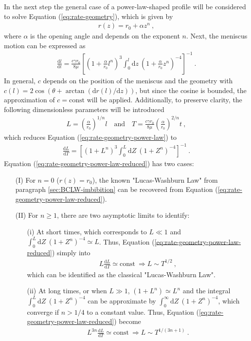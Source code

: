 \documentclass[aip, amsmath, amssymb, reprint, twocolumn, floatfix]{revtex4-1}
\newcommand{\dldt}{\frac{\mathrm{d}l}{\mathrm{d}t}}
\newcommand{\dLdT}{\frac{\mathrm{d}L}{\mathrm{d}T}}
\newcommand{\dz}{\mathrm{d}z}
\newcommand{\dZ}{\mathrm{d}Z}
\begin{document}
In the next step the general case of a power-law-shaped profile will be considered to solve Equation (\ref{eq:rate-geometry}), which is given by
\begin{gather}
	r(z) = r_0 + \alpha z^n~,
	\label{eq:power-law}
\end{gather}
where $\alpha$ is the opening angle and depends on the exponent $n$. Next, the meniscus motion can be expressed as 
\begin{gather}
	\dldt = \frac{c \gamma r_0}{8\mu} \left[ \left(1 + \frac{\alpha}{r_0} l^n \right)^3 \int_0^{l}\!\!\!\dz~\left(1 + \frac{\alpha}{r_0} z^n \right)^{-4} \right]^{-1}~.
	\label{eq:rate-geometry-power-law}
\end{gather}
In general, $c$ depends on the position of the meniscus and the geometry with $c(l) = 2\cos(\theta + \arctan(\mathrm{d}r(l)/\mathrm{d}z))$, but since the cosine is bounded, the approximation of $c = \text{const}$ will be applied. Additionally, to preserve clarity, the following dimensionless parameters will be introduced
\begin{gather}
	L = \left(\frac{\alpha}{r_0}\right)^{1/n} l\quad\text{and}\quad T = \frac{c\gamma r_0}{8\mu} \left(\frac{\alpha}{r_0}\right)^{2/n} t~,
\end{gather}
which reduces Equation (\ref{eq:rate-geometry-power-law}) to
\begin{gather}
	\dLdT = \left[ \left(1 + L^n \right)^3 \int_0^{L}\!\!\!\dZ~\left(1 + Z^n \right)^{-4} \right]^{-1}~.
	\label{eq:rate-geometry-power-law-reduced}
\end{gather}
Equation (\ref{eq:rate-geometry-power-law-reduced}) has two cases:
\begin{itemize}
	\item[(I)] For $n = 0$ ($r(z) = r_0$), the known "Lucas-Washburn Law" from paragraph \ref{sec:BCLW-imbibition} can be recovered from Equation (\ref{eq:rate-geometry-power-law-reduced}).
	\item[(II)] For $n \ge 1$, there are two asymptotic limits to identify:
	\begin{itemize}
		\item[(i)] At short times, which corresponds to $L \ll 1$ and $\int_0^{L}\!\dZ~\left(1 + Z^n \right)^{-4} \simeq L$. Thus, Equation (\ref{eq:rate-geometry-power-law-reduced}) simply into
		\begin{gather}
			L \dLdT \simeq \text{const}~ \Rightarrow \boxed{L \sim T^{1/2}}~,
		\end{gather}
		which can be identified as the classical "Lucas-Washburn Law".
		\item[(ii)]  At long times, or when $L \gg 1$, $(1+L^n) \simeq L^n$ and the integral $\int_0^{L}\!\!\!\dZ~\left(1 + Z^n \right)^{-4}$ can be approximate by $\int_0^{\infty}\!\dZ~\left(1 + Z^n \right)^{-4}$, which converge if $n > 1/4$ to a constant value. Thus, Equation (\ref{eq:rate-geometry-power-law-reduced}) become
		\begin{gather}
			L^{3n} \dLdT \simeq \text{const}~\Rightarrow \boxed{L \sim T^{1/(3n+1)}}~.
		\end{gather}
	\end{itemize}
\end{itemize}
\end{document}
